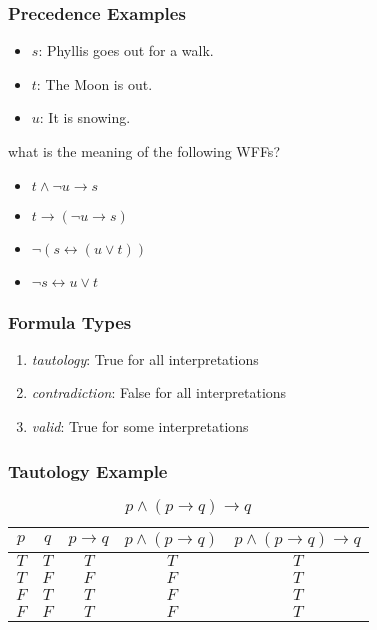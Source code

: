 \documentclass[dvipsnames]{beamer}
\begin{document}
\begin{frame}
  \frametitle{Precedence Examples}

  \begin{example}
    \begin{itemize}
      \item $s$: Phyllis goes out for a walk.
      \item $t$: The Moon is out.
      \item $u$: It is snowing.
    \end{itemize}

    \medskip
    what is the meaning of the following WFFs?

    \pause
    \begin{itemize}
      \item $t \wedge \neg u \rightarrow s$
      \pause
      \item $t \rightarrow (\neg u \rightarrow s)$
      \pause
      \item $\neg (s \leftrightarrow (u \vee t))$
      \pause
      \item $\neg s \leftrightarrow u \vee t$
    \end{itemize}
  \end{example}
\end{frame}

\begin{frame}
  \frametitle{Formula Types}

  \begin{enumerate}
    \item \emph{tautology}: True for all interpretations
    \item \emph{contradiction}: False for all interpretations
    \item \emph{valid}: True for some interpretations
  \end{enumerate}
\end{frame}

\begin{frame}
  \frametitle{Tautology Example}

  \begin{example}
    \begin{table}
      \caption{$p \wedge (p \rightarrow q) \rightarrow q$}
      \begin{tabular}{|c|c|c|c||c|}\hline
        $p$ & $q$ & $p \rightarrow q$ & $p \wedge (p \rightarrow q)$
            & $p \wedge (p \rightarrow q) \rightarrow q$\\\hline\hline
        $T$ & $T$ & $T$ & $T$ & $T$                     \\\hline
        $T$ & $F$ & $F$ & $F$ & $T$                     \\\hline
        $F$ & $T$ & $T$ & $F$ & $T$                     \\\hline
        $F$ & $F$ & $T$ & $F$ & $T$                     \\\hline
      \end{tabular}
    \end{table}
  \end{example}
\end{frame}
\end{document}
